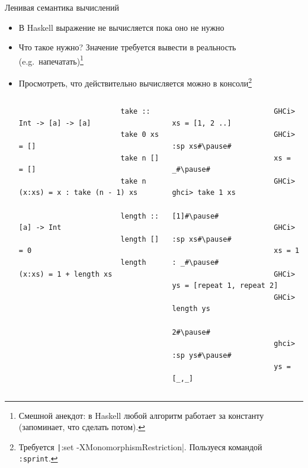     \begin{frame}[fragile]{Ленивая семантика вычислений}
        \vspace{-0.5em}
        \begin{itemize}
            \item В Haskell выражение не вычисляется пока оно не нужно
            \item Что такое нужно? \pause Значение требуется вывести в реальность (e.g.\ напечатать)\footnote{Смешной анекдот: в Haskell любой алгоритм работает за константу (запоминает, что сделать потом).}
            \item Просмотреть, что действительно вычисляется можно в консоли\footnote{Требуется \texttt|:set -XMonomorphismRestriction|. Пользуеся командой \texttt{:sprint}.}
            \begin{columns}[onlytextwidth]
                \begin{column}{0.485\textwidth}
                    \begin{verbatim}
                        take :: Int -> [a] -> [a]
                        take 0 xs = []
                        take n [] = []
                        take n (x:xs) = x : take (n - 1) xs

                        length :: [a] -> Int
                        length [] = 0
                        length (x:xs) = 1 + length xs
                    \end{verbatim}
                \end{column}\hfill%
                \begin{column}{0.485\textwidth}
                    \begin{verbatim}
                        GHCi> xs = [1, 2 ..]
                        GHCi> :sp xs#\pause#
                        xs = _#\pause#
                        GHCi> ghci> take 1 xs
                        [1]#\pause#
                        GHCi> :sp xs#\pause#
                        xs = 1 : _#\pause#
                        GHCi> ys = [repeat 1, repeat 2]
                        GHCi> length ys
                        2#\pause#
                        ghci> :sp ys#\pause#
                        ys = [_,_]
                    \end{verbatim}
                \end{column}
            \end{columns}
        \end{itemize}
    \end{frame}

